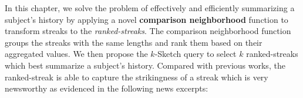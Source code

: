 In this chapter, we solve the problem of effectively and efficiently 
summarizing a subject's history by
applying a novel \textbf{comparison neighborhood} function to transform streaks to the \emph{ranked-streaks}. 
The comparison neighborhood function groups the streaks with the same lengths and rank them based on their aggregated values.
We then propose the $k$-Sketch query to select $k$ ranked-streaks 
which best summarize a subject's history.
Compared with previous works,
the ranked-streak is able to capture the strikingness of a streak 
which is very newsworthy as evidenced in the following news excerpts:


